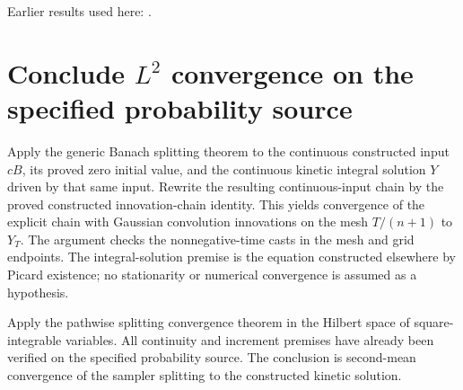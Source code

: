 \documentclass[11pt,a4paper]{article}
\begin{document}
Earlier results used here: \cite[Section~3.8.17]{LangevinLean2026ULASC}.

\section{\texorpdfstring{Conclude \(L^{2}\) convergence on the specified probability source}{Conclude L² convergence on the specified probability source}}


Apply the generic Banach splitting theorem to the continuous constructed input \(cB\), its proved zero initial value, and the continuous kinetic integral solution \(Y\) driven by that same input. Rewrite the resulting continuous-input chain by the proved constructed innovation-chain identity. This yields convergence of the explicit chain with Gaussian convolution innovations on the mesh \(T/(n+1)\) to \(Y_T\). The argument checks the nonnegative-time casts in the mesh and grid endpoints. The integral-solution premise is the equation constructed elsewhere by Picard existence; no stationarity or numerical convergence is assumed as a hypothesis.



Apply the pathwise splitting convergence theorem in the Hilbert space of square-integrable variables. All continuity and increment premises have already been verified on the specified probability source. The conclusion is second-mean convergence of the sampler splitting to the constructed kinetic solution.
\end{document}
